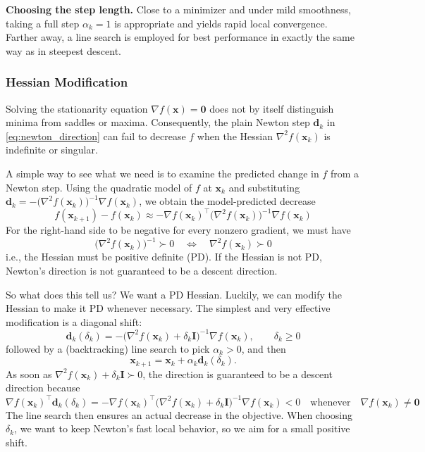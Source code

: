 \textbf{Choosing the step length.}\quad
Close to a minimizer and under mild smoothness, taking a full step $\alpha_k=1$ is appropriate and yields rapid local convergence. Farther away, a line search is employed for best performance in exactly the same way as in steepest descent.

\subsubsection{Hessian Modification}
Solving the stationarity equation $\nabla f(\mathbf{x})=\mathbf{0}$ does not by itself distinguish minima from saddles or maxima. Consequently, the plain Newton step $\mathbf{d}_k$ in \eqref{eq:newton_direction} can fail to decrease $f$ when the Hessian $\nabla^2 f(\mathbf{x}_k)$ is indefinite or singular.

A simple way to see what we need is to examine the predicted change in $f$ from a Newton step. Using the quadratic model of $f$ at $\mathbf{x}_k$ and substituting $\mathbf{d}_k=-\big(\nabla^2 f(\mathbf{x}_k)\big)^{-1}\nabla f(\mathbf{x}_k)$, we obtain the model-predicted decrease
\begin{equation}
f(\mathbf{x}_{k+1})-f(\mathbf{x}_k)
\approx
-\nabla f(\mathbf{x}_k)^\top
\big(\nabla^2 f(\mathbf{x}_k)\big)^{-1}
\nabla f(\mathbf{x}_k)
\end{equation}
For the right-hand side to be negative for every nonzero gradient, we must have
\begin{equation}
\big(\nabla^2 f(\mathbf{x}_k)\big)^{-1} \succ 0 
\quad\iff\quad 
\nabla^2 f(\mathbf{x}_k)\succ 0
\end{equation}
i.e., the Hessian must be positive definite (PD). If the Hessian is not PD, Newton's direction is not guaranteed to be a descent direction.

So what does this tell us? We want a PD Hessian. Luckily, we can modify the Hessian to make it PD whenever necessary. The simplest and very effective modification is a diagonal shift:
\begin{equation}
\mathbf{d}_k(\delta_k)
=
-\big(\nabla^2 f(\mathbf{x}_k)+\delta_k \mathbf{I}\big)^{-1}\nabla f(\mathbf{x}_k),
\qquad \delta_k\ge 0
\end{equation}
followed by a (backtracking) line search to pick $\alpha_k>0$, and then
\begin{equation}
\mathbf{x}_{k+1}=\mathbf{x}_k+\alpha_k\mathbf{d}_k(\delta_k).
\end{equation}
As soon as $\nabla^2 f(\mathbf{x}_k)+\delta_k\mathbf{I}\succ 0$, the direction is guaranteed to be a descent direction because
\begin{equation}
\nabla f(\mathbf{x}_k)^\top \mathbf{d}_k(\delta_k)
=
-\nabla f(\mathbf{x}_k)^\top
\big(\nabla^2 f(\mathbf{x}_k)+\delta_k \mathbf{I}\big)^{-1}
\nabla f(\mathbf{x}_k)
<0
\quad\text{whenever}\quad \nabla f(\mathbf{x}_k)\ne \mathbf{0}
\end{equation}
The line search then ensures an actual decrease in the objective. When choosing $\delta_k$, we want to keep Newton's fast local behavior, so we aim for a small positive shift.

